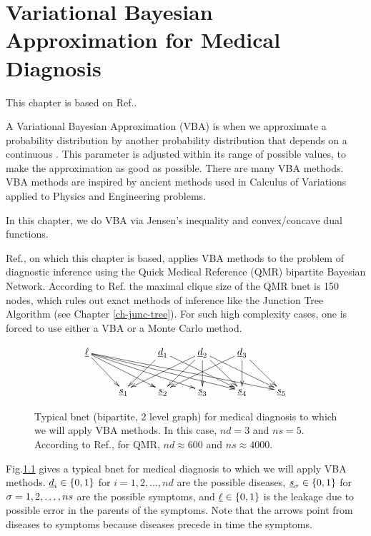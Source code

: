 \chapter{Variational Bayesian Approximation
for Medical Diagnosis}
\label{ch-var-bay-medical}

This chapter is based
on Ref.\cite{jaak-jordan}.

A Variational Bayesian Approximation (VBA)
is when we approximate
a probability distribution
by another 
probability distribution that depends
on a continuous .
This parameter is
adjusted 
within its range of possible values,
to make the approximation
as good as possible.
There are many VBA methods.
VBA methods are inspired by 
ancient  methods
used in Calculus 
of Variations applied to Physics
and Engineering problems.

In this chapter,
we do VBA  via
Jensen's inequality and
convex/concave dual functions.

Ref.\cite{jaak-jordan}, on which
this chapter is based,
applies VBA methods to the problem of diagnostic inference using the Quick Medical Reference (QMR) bipartite Bayesian Network. 
According to Ref.\cite{jaak-jordan} 
the maximal clique size of the QMR 
bnet is
150 nodes, which rules out exact methods
of inference like the Junction Tree Algorithm
(see Chapter \ref{ch-junc-tree}).
For such high complexity cases,
one is forced to use
either a VBA or a Monte Carlo method.

\begin{figure}[h!]
$$\xymatrix{
\ul{\ell}
\ar[dr]\ar[drr]\ar[drrr]\ar[drrrr]\ar[drrrrr]
&
&\rvd_1\ar[dl]\ar[drr]
&\rvd_2\ar[dll]\ar[dl]\ar[dr]\ar[d]\ar[drr]
&\rvd_3\ar[dll]\ar[d]\ar[dr]
\\
&\rvs_1
&\rvs_2
&\rvs_3
&\rvs_4
&\rvs_5
}$$
\caption{
Typical bnet (bipartite, 2 level graph) 
for medical diagnosis
to which we will apply VBA
methods.
In this case, $nd=3$ and
$ns=5$. 
According to Ref.\cite{jaak-jordan},
for QMR, $nd\approx 600$ 
and $ns\approx 4000$.
}
\label{fig-var-bay-med-bnet}
\end{figure}

Fig.\ref{fig-var-bay-med-bnet}
gives a typical bnet
for medical diagnosis
to which we will apply VBA methods.
$\rvd_i\in \bool$
for $i=1,2, \ldots, nd$
are the possible diseases,
$\rvs_\s\in\bool$ 
for $\sigma=1,2, \ldots, ns$ are the possible
symptoms, and $\ul{\ell}\in\bool$
is the leakage  due to 
possible error in 
the parents of the symptoms.
Note that the 
arrows point from
diseases to symptoms
because diseases precede
in time
the symptoms.

